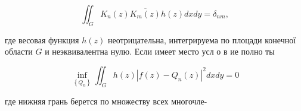 \documentclass[10pt]{article}
\begin{document}
\[
\iint_{G} K_{n}(z) \overline{K_{m}(z)} h(z) d x d y=\delta_{n m},
\]

где весовая функция $h(z)$ неотрицательна, интегрируема по плоцади конечної области $G$ и неэквивалентна нулю. Если имеет место усл о в ие полно ты

\[
\inf _{\left\{Q_{n}\right\}} \iint_{G} h(z)\left|f(z)-Q_{n}(z)\right|^{2} d x d y=0
\]

где нижняя грань берется по множеству всех многочле-
\end{document}
